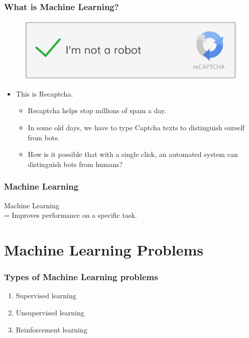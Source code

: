 \documentclass[aspectratio=169]{beamer}
\begin{document}
\begin{frame}
	\frametitle{What is Machine Learning?}
	\pause
	\begin{figure}
		\includegraphics[scale=0.4]{imgs/recaptcha.png}
	\end{figure}
	\begin{itemize}
		\pause
		\item This is Recaptcha.
		      \begin{itemize}
			      \pause
			      \item Recaptcha helps stop millions of spam a day.
			            \pause
			      \item In some old days, we have to type Captcha texts to distinguish ourself from bots.
			            \pause
			      \item How is it possible that with a single click, an automated system can distinguish bots from humans?
		      \end{itemize}
	\end{itemize}
\end{frame}

\begin{frame}
	\frametitle{Machine Learning}
	\begin{center}
		Machine Learning \\
		\onslide<2-> \huge = Improves performance on a specific task.
	\end{center}
\end{frame}

\section{Machine Learning Problems}

\begin{frame}
	\frametitle{Types of Machine Learning problems}
	\begin{enumerate}
		\item<2-> Supervised learning
		\item<3-> Unsupervised learning
		\item<4-> Reinforcement learning
	\end{enumerate}
\end{frame}
\end{document}
